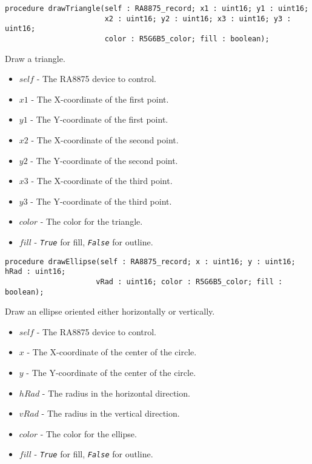 \documentclass[10pt, openany]{book}
\newcommand{\constant}[1]{\emph{\texttt{#1}}}
\begin{document}
\begin{lstlisting}
procedure drawTriangle(self : RA8875_record; x1 : uint16; y1 : uint16;
                       x2 : uint16; y2 : uint16; x3 : uint16; y3 : uint16;
                       color : R5G6B5_color; fill : boolean);
\end{lstlisting}
Draw a triangle.
\begin{itemize}
  \item $self$ - The RA8875 device to control.
  \item $x1$ - The X-coordinate of the first point.
  \item $y1$ - The Y-coordinate of the first point.
  \item $x2$ - The X-coordinate of the second point.
  \item $y2$ - The Y-coordinate of the second point.
  \item $x3$ - The X-coordinate of the third point.
  \item $y3$ - The Y-coordinate of the third point.
  \item $color$ - The color for the triangle.
  \item $fill$ - \constant{True} for fill, \constant{False} for outline.
\end{itemize}

\begin{lstlisting}
procedure drawEllipse(self : RA8875_record; x : uint16; y : uint16; hRad : uint16;
                     vRad : uint16; color : R5G6B5_color; fill : boolean);
\end{lstlisting}
Draw an ellipse oriented either horizontally or vertically.
\begin{itemize}
  \item $self$ - The RA8875 device to control.
  \item $x$ - The X-coordinate of the center of the circle.
  \item $y$ - The Y-coordinate of the center of the circle.
  \item $hRad$ - The radius in the horizontal direction.
  \item $vRad$ - The radius in the vertical direction.
  \item $color$ - The color for the ellipse.
  \item $fill$ - \constant{True} for fill, \constant{False} for outline.
\end{itemize}
\end{document}
